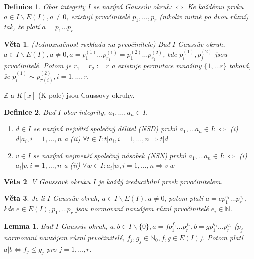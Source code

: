 \documentclass[a4paper, 11pt]{report}
\newtheorem{mydef}{Definice}[chapter]
\newtheorem{veta}{Věta}
\newtheorem{lemma}{Lemma}
\begin{document}
\begin{mydef}
Obor integrity $I$ se nazývá Gaussův okruh: $\Leftrightarrow$ Ke každému prvku $a \in I \backslash E(I), a \not= 0$, existují prvočinitelé $p_1, \dots, p_r$ (nikoliv nutně po dvou různí) tak, že platí $a = p_1 \dots p_r$
\end{mydef}

\begin{veta}
(Jednoznačnost rozkladu na prvočinitele) Buď $I$ Gaussův okruh, $a \in I \backslash E(I), a \not= 0, a = p_1^{(1)} \dots p_{r_1}^{(1)} = p_1^{(2)} \dots p_{r_2}^{(2)}$, kde $p_i^{(1)}, p_j^{(2)}$ jsou prvočinitelé. Potom je $r_1 = r_2 := r$ a existuje permutace množiny $\{1, \dots r\}$ taková, že $p_i^{(1)} \sim p_{\pi(i)}^{(2)}, i = 1, \dots, r$.
\end{veta}

$\mathbb{Z}$ a $K[x]$ (K pole) jsou Gaussovy okruhy.

\begin{mydef}
Buď $I$ obor integrity, $a_1, \dots, a_n \in I$.
\begin{enumerate}[1)]
	\item $d \in I$ se nazývá \emph{největší společný dělitel} (NSD) prvků $a_1, \dots a_n \in I: \Leftrightarrow$ (i) $d | a_i, i = 1, \dots, n$ a (ii) $\forall t \in I: t|a_i, i = 1, \dots, n \Rightarrow t | d$
	\item $v \in I$ se nazývá \emph{nejmenší společný násobek} (NSN) prvků $a_1, \dots a_n \in I: \Leftrightarrow$ (i) $a_i | v, i = 1, \dots, n$ a (ii) $\forall w \in I: a_i | w, i = 1, \dots, n \Rightarrow v | w$
\end{enumerate}
\end{mydef}

\begin{veta}
V Gaussově okruhu $I$ je každý ireducibilní prvek prvočinitelem.
\end{veta}

\begin{veta}
Je-li $I$ Gaussův okruh, $a \in I \backslash E(I), a \not=0$, potom platí $a = e p_1^{e_1} \dots p_r^{e_r}$, kde $e \in E(I), p_1, \dots p_r$ jsou normovaní navzájem různí prvočinitelé $e_i \in \mathbb{N}$. 
\end{veta}

\begin{lemma}
Buď $I$ Gaussův okruh, $a, b \in I \backslash \{0\}, a = fp_1^{f_1} \dots p_r^{f_r}, b = g p_1^{g_1} \dots p_r^{g_r}$ ($p_j$ normovaní navzájem různí prvočinitelé, $f_j, g_j \in \mathbb{N}_0, f,g \in E(I)$). Potom platí $a|b \Leftrightarrow f_j \leq g_j$ pro $j = 1, \dots, r$.
\end{lemma}
\end{document}
